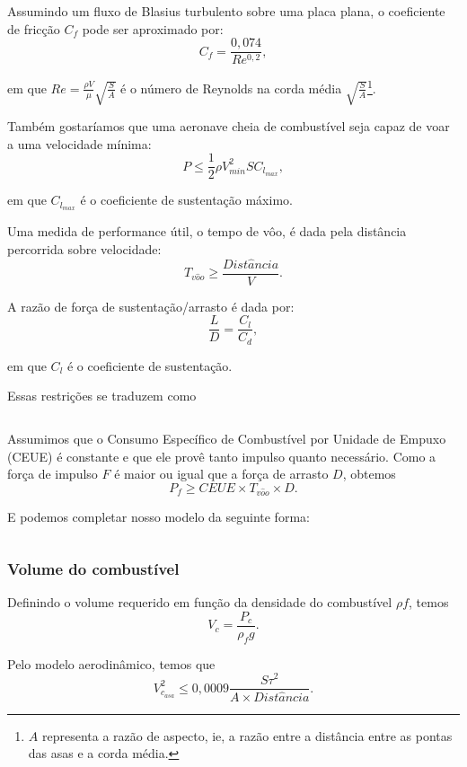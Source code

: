 \documentclass{article}
\begin{document}
Assumindo um fluxo de Blasius turbulento sobre uma placa plana, o
coeficiente de fricção $C_f$ pode ser aproximado por:
\[
  C_f = \frac{0,074}{Re^{0,2}},
\]

\noindent em que $Re = \frac{\rho V}{\mu}\sqrt{\frac{S}{A}}$ é o
número de Reynolds na corda média $\sqrt{\frac{S}{A}}$\footnote{$A$
  representa a razão de aspecto, ie, a razão entre a distância entre
  as pontas das asas e a corda média.}.

Também gostaríamos que uma aeronave cheia de combustível seja capaz de
voar a uma velocidade mínima:
\[
  P \leq \frac{1}{2}\rho V_{min}^{2} S C_{l_{max}},
\]

\noindent em que $C_{l_{max}}$ é o coeficiente de sustentação máximo.

Uma medida de performance útil, o tempo de vôo, é dada pela distância
percorrida sobre velocidade:
\[
  T_{v\hat{o}o} \geq \frac{Dist\hat{a}ncia}{V}.
\]

A razão de força de sustentação/arrasto é dada por:
\[
  \frac{L}{D} = \frac{C_l}{C_d},
\]

\noindent em que $C_l$ é o coeficiente de sustentação.

Essas restrições se traduzem como

\inputminted{python}{../Exemplos/Cap15/prog1_wlm.py}


Assumimos que o Consumo Específico de Combustível por Unidade de
Empuxo (CEUE) é constante e que ele provê tanto impulso quanto
necessário. Como a força de impulso $F$ é maior ou igual que a força
de arrasto $D$, obtemos
\[
  P_f \geq CEUE \times T_{v\hat{o}o} \times D.
\]

E podemos completar nosso modelo da seguinte forma:

\inputminted{python}{../Exemplos/Cap15/prog2_tdm.py}

\subsubsection{Volume do combustível}

Definindo o volume requerido em função da densidade do combustível
$\rho f$, temos
\[
  V_c = \frac{P_c}{\rho_f g}.
\]

Pelo modelo aerodinâmico, temos que
\[
  V_{c_{asa}}^2 \leq 0,0009\frac{S\tau^2}{A \times Dist\hat{a}ncia}.
\]
\end{document}

